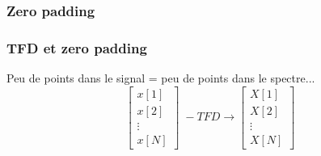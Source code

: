 \documentclass{beamer}
\begin{document}
%

\subsubsection{Zero padding}
\begin{frame}
\frametitle{TFD et zero padding}
Peu de points dans le signal = peu de points dans le spectre...\\

\vspace{0.1cm}
\[
\begin{bmatrix} x[1] \\ x[2] \\ \vdots \\ x[N] \end{bmatrix} \; -TFD \rightarrow  
\begin{bmatrix} X[1] \\ X[2] \\ \vdots \\ X[N] \end{bmatrix}
\]
\vspace{0.1cm}

\end{frame} 
\end{document}
